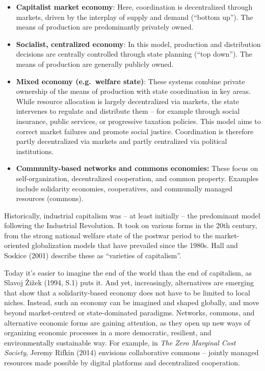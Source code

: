 \documentclass[
  a4paper,
  openany]{book}
\begin{document}
\begin{itemize}
\item
  \textbf{Capitalist market economy}: Here, coordination is
  decentralized through markets, driven by the interplay of supply and
  demand (``bottom up''). The means of production are predominantly
  privately owned.
\item
  \textbf{Socialist, centralized economy}: In this model, production and
  distribution decisions are centrally controlled through state planning
  (``top down''). The means of production are generally publicly owned.
\item
  \textbf{Mixed economy (e.g.~welfare state)}: These systems combine
  private ownership of the means of production with state coordination
  in key areas. While resource allocation is largely decentralized via
  markets, the state intervenes to regulate and distribute them -- for
  example through social insurance, public services, or progressive
  taxation policies. This model aims to correct market failures and
  promote social justice. Coordination is therefore partly decentralized
  via markets and partly centralized via political institutions.
\item
  \textbf{Community-based networks and commons economies:} These focus
  on self-organization, decentralized cooperation, and common property.
  Examples include solidarity economies, cooperatives, and communally
  managed resources (commons).
\end{itemize}

Historically, industrial capitalism was -- at least initially -- the
predominant model following the Industrial Revolution. It took on
various forms in the 20th century, from the strong national welfare
state of the postwar period to the market-oriented globalization models
that have prevailed since the 1980s. Hall and Soskice (2001) describe
these as ``varieties of capitalism''.

Today it's easier to imagine the end of the world than the end of
capitalism, as Slavoj Žižek (1994, S.1) puts it. And yet, increasingly,
alternatives are emerging that show that a solidarity-based economy does
not have to be limited to local niches. Instead, such an economy can be
imagined and shaped globally, and move beyond market-centred or
state-dominated paradigms. Networks, commons, and alternative economic
forms are gaining attention, as they open up new ways of organizing
economic processes in a more democratic, resilient, and environmentally
sustainable way. For example, in \emph{The Zero Marginal Cost Society},
Jeremy Rifkin (2014) envisions collaborative commons -- jointly managed
resources made possible by digital platforms and decentralized
cooperation.
\end{document}

